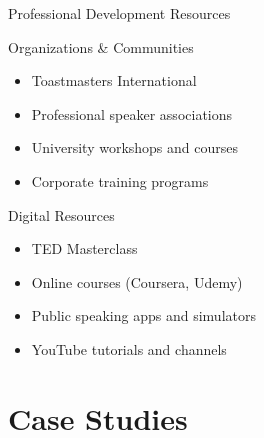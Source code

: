 \documentclass{beamer}
\begin{document}
\begin{frame}{Professional Development Resources}
    \begin{block}{Organizations \& Communities}
        \begin{itemize}
            \item Toastmasters International
            \item Professional speaker associations
            \item University workshops and courses
            \item Corporate training programs
        \end{itemize}
    \end{block}
    
    \begin{block}{Digital Resources}
        \begin{itemize}
            \item TED Masterclass
            \item Online courses (Coursera, Udemy)
            \item Public speaking apps and simulators
            \item YouTube tutorials and channels
        \end{itemize}
    \end{block}
\end{frame}

\section{Case Studies}
\end{document}

